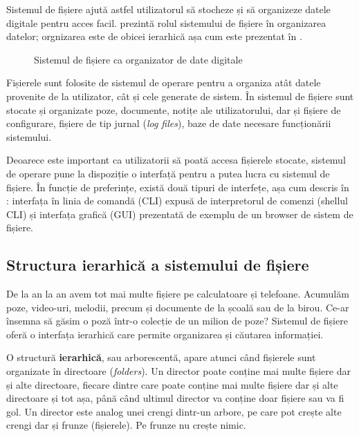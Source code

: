 Sistemul de fișiere ajută astfel utilizatorul să stocheze și să organizeze datele digitale pentru acces facil.
 prezintă rolul sistemului de fișiere în organizarea datelor;
orgnizarea este de obicei ierarhică așa cum este prezentat în .

\begin{figure}[htbp]
  \centering
  \def\svgwidth{0.5\columnwidth}
  
  \caption{Sistemul de fișiere ca organizator de date digitale}
  \label{fig:fs:def-fs}
\end{figure}

Fișierele sunt folosite de sistemul de operare pentru a organiza atât datele provenite de la utilizator, cât și cele generate de sistem.
În sistemul de fișiere sunt stocate și organizate poze, documente, notițe ale utilizatorului, dar și fișiere de configurare, fișiere de tip jurnal (\textit{log files}), baze de date necesare funcționării sistemului.

Deoarece este important ca utilizatorii să poată accesa fișierele stocate, sistemul de operare pune la dispoziție o interfață pentru a putea lucra cu sistemul de fișiere.
În funcție de preferințe, există două tipuri de interfețe, așa cum descris în : interfața în linia de comandă (CLI) expusă de interpretorul de comenzi (shellul CLI) și interfața grafică (GUI) prezentată de exemplu de un browser de sistem de fișiere.

\subsection{Structura ierarhică a sistemului de fișiere}
\label{sec:fs:filesystem}

De la an la an avem tot mai multe fișiere pe calculatoare și telefoane.
Acumulăm poze, video-uri, melodii, precum și documente de la școală sau de la birou.
Ce-ar însemna să găsim o poză într-o colecție de un milion de poze? Sistemul de fișiere oferă o interfața ierarhică care permite organizarea și căutarea informației.

O structură \textbf{ierarhică}, sau arborescentă, apare atunci când fișierele sunt organizate în directoare (\textit{folders}).
Un director poate conține mai multe fișiere dar și alte directoare, fiecare dintre care poate conține mai multe fișiere dar și alte directoare și tot așa, până când ultimul director va conține doar fișiere sau va fi gol.
Un director este analog unei crengi dintr-un arbore, pe care pot crește alte crengi dar și frunze (fișierele).
Pe frunze nu crește nimic.

